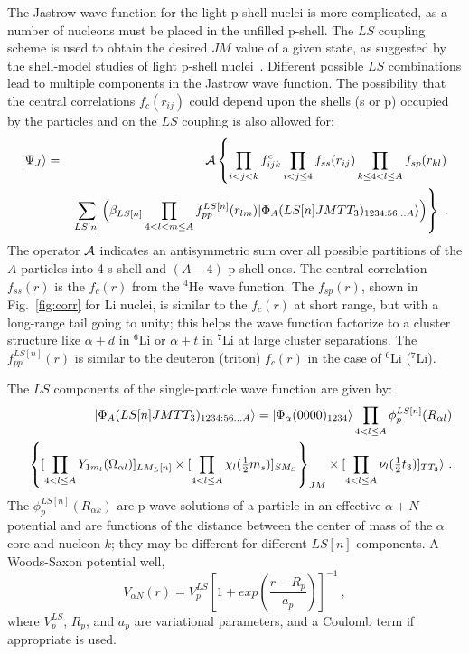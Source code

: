 The Jastrow wave function for the light p-shell nuclei is more complicated, 
as a number of nucleons must be placed in the unfilled p-shell.
The $LS$ coupling scheme is used to obtain the desired $JM$ value of a given state,
as suggested by the shell-model studies of light p-shell nuclei~\cite{CK65}.
Different possible $LS$ combinations lead to multiple components in the
Jastrow wave function.
The possibility that the central correlations $f_{c}(r_{ij})$
could depend upon the shells (s or p) occupied by the
particles and on the $LS$ coupling is also allowed for:
\begin{eqnarray}
  |\Psi_J\rangle &=& {\cal A} \left\{
     \prod_{i<j<k}f^c_{ijk}
     \prod_{i<j \leq 4}f_{ss}(r_{ij})
     \prod_{k \leq 4 < l \leq A} f_{sp}(r_{kl}) \right. \\
  && \left.  \sum_{LS[n]} \Big( \beta_{LS[n]} \prod_{4 < l < m \leq A}
     f^{LS[n]}_{pp}(r_{lm})
     |\Phi_{A}(LS[n]JMTT_{3})_{1234:56\ldots A}\rangle \Big) \right\} \ .
     \nonumber 
\label{eq:jastrow}
\end{eqnarray}
The operator ${\cal A}$ indicates an antisymmetric sum over all possible
partitions of the $A$ particles into 4 s-shell and $(A-4)$ p-shell ones.
The central correlation $f_{ss}(r)$ is the $f_c(r)$ from the $^{4}$He
wave function. 
The $f_{sp}(r)$, shown in Fig.~\ref{fig:corr} for Li nuclei, is similar to 
the $f_c(r)$ at short range, but with a long-range tail going to unity; 
this helps the wave function factorize to a cluster structure like
$\alpha + d$ in $^6$Li or $\alpha + t$ in $^7$Li at large cluster separations.
The $f^{LS[n]}_{pp}(r)$ is similar to the deuteron (triton) $f_c(r)$ in the
case of $^6$Li ($^7$Li).

The $LS$ components of the single-particle wave function are given by:
\begin{eqnarray}
 &&  |\Phi_{A}(LS[n]JMTT_{3})_{1234:56\ldots A}\rangle =
     |\Phi_{\alpha}(0 0 0 0)_{1234}\rangle \prod_{4 < l\leq A}
     \phi^{LS[n]}_{p}(R_{\alpha l}) \\
 &&  \left\{ [ \prod_{4 < l\leq A} Y_{1m_l}(\Omega_{\alpha l}) ]_{LM_L[n]}
     \times [ \prod_{4 < l\leq A} \chi_{l}(\textstyle{1\over2}m_s) ]_{SM_S}
     \right\}_{JM}
     \times [ \prod_{4 < l\leq A} \nu_{l}(\textstyle{1\over2}t_3) ]_{TT_3}\rangle 
     \nonumber \ .
\label{eq:phi}
\end{eqnarray}
The $\phi^{LS[n]}_{p}(R_{\alpha k})$ are p-wave solutions of a particle
in an effective $\alpha + N$ potential and are functions of the distance
between the center of mass of the $\alpha$ core and nucleon $k$; they
may be different for different $LS[n]$ components.
A Woods-Saxon potential well,
\begin{equation}
     V_{\alpha N}(r) = V^{LS}_p [1+exp(\frac{r-R_p}{a_p})]^{-1} \ ,
\label{eq:spwell}
\end{equation}
where $V^{LS}_p$, $R_p$, and $a_p$ are variational parameters, and
a Coulomb term if appropriate is used.

